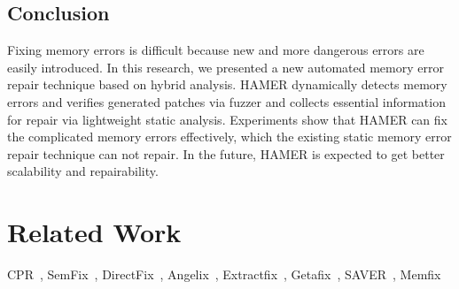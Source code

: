 \documentclass[a4paper,11pt,oneside,openany]{book}
\begin{document}
\section{Conclusion}
Fixing memory errors is difficult because new and more dangerous errors are easily introduced. In this research, we presented a new automated memory error repair technique based on hybrid analysis. HAMER dynamically detects memory errors and verifies generated patches via fuzzer and collects essential information for repair via lightweight static analysis. Experiments show that HAMER can fix the complicated memory errors effectively, which the existing static memory error repair technique can not repair. In the future, HAMER is expected to get better scalability and repairability.
\chapter{Related Work}
CPR~\cite{CPR}, SemFix~\cite{semfix}, DirectFix~\cite{directfix}, Angelix~\cite{Angelix}, Extractfix~\cite{Extractfix}, Getafix~\cite{Getafix}, SAVER~\cite{SAVER}, Memfix~\cite{Memfix}



\end{document}
